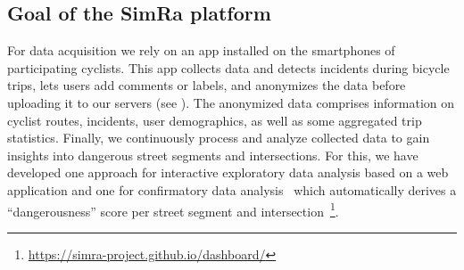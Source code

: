 \subsection{Goal of the SimRa platform}
\label{subsec:simra}

For data acquisition we rely on an app installed on the smartphones of participating cyclists.
This app collects data and detects incidents during bicycle trips, lets users add comments or labels, and anonymizes the data before uploading it to our servers (see ).
The anonymized data comprises information on cyclist routes, incidents, user demographics, as well as some aggregated trip statistics.
Finally, we continuously process and analyze collected data to gain insights into dangerous street segments and intersections.
For this, we have developed one approach for interactive exploratory data analysis based on a web application and one for confirmatory data analysis~\cite{bermbach2017cloud} which automatically derives a ``dangerousness'' score per street segment and intersection~\footnote{\url{https://simra-project.github.io/dashboard/}}.

